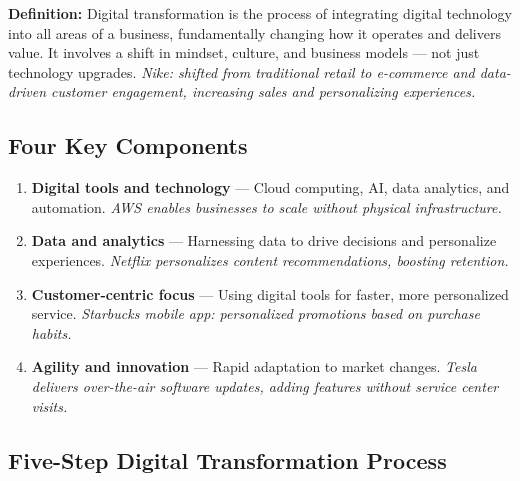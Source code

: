 \documentclass[11pt, letterpaper]{article}
\begin{document}
\begin{defbox}
\textbf{Definition:} Digital transformation is the process of integrating digital technology into all areas of a business, fundamentally changing how it operates and delivers value. It involves a shift in mindset, culture, and business models --- not just technology upgrades. \textit{Nike: shifted from traditional retail to e-commerce and data-driven customer engagement, increasing sales and personalizing experiences.}
\end{defbox}

\subsection{Four Key Components}

\begin{enumerate}[leftmargin=*, label=\textbf{\arabic*.}]
  \item \textbf{Digital tools and technology} --- Cloud computing, AI, data analytics, and automation. \textit{AWS enables businesses to scale without physical infrastructure.}
  \item \textbf{Data and analytics} --- Harnessing data to drive decisions and personalize experiences. \textit{Netflix personalizes content recommendations, boosting retention.}
  \item \textbf{Customer-centric focus} --- Using digital tools for faster, more personalized service. \textit{Starbucks mobile app: personalized promotions based on purchase habits.}
  \item \textbf{Agility and innovation} --- Rapid adaptation to market changes. \textit{Tesla delivers over-the-air software updates, adding features without service center visits.}
\end{enumerate}

\subsection{Five-Step Digital Transformation Process}
\end{document}
